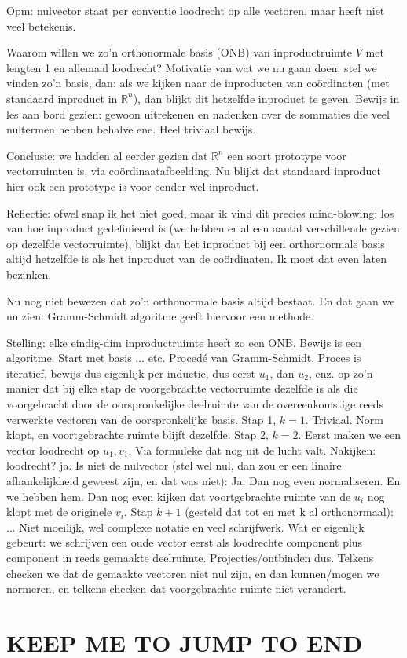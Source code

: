 \documentclass{article}
\begin{document}
Opm: nulvector staat per conventie loodrecht op alle vectoren, maar heeft niet veel betekenis. 

Waarom willen we zo'n orthonormale basis (ONB) van inproductruimte $V$ met lengten 1 en allemaal loodrecht? Motivatie van wat we nu gaan doen: stel we vinden zo'n basis, dan: als we kijken naar de inproducten van co\"ordinaten (met standaard inproduct in $\mathbb{R}^n$), dan blijkt dit hetzelfde inproduct te geven. Bewijs in les aan bord gezien: gewoon uitrekenen en nadenken over de sommaties die veel nultermen hebben behalve ene. Heel triviaal bewijs. 

Conclusie: we hadden al eerder gezien dat $\mathbb{R}^n$ een soort prototype voor vectorruimten is, via co\"ordinaatafbeelding. Nu blijkt dat standaard inproduct hier ook een prototype is voor eender wel inproduct. 

Reflectie: ofwel snap ik het niet goed, maar ik vind dit precies mind-blowing: los van hoe inproduct gedefinieerd is (we hebben er al een aantal verschillende gezien op dezelfde vectorruimte), blijkt dat het inproduct bij een orthornormale basis altijd hetzelfde is als het inproduct van de co\"ordinaten. Ik moet dat even laten bezinken. 

Nu nog niet bewezen dat zo'n orthonormale basis altijd bestaat. En dat gaan we nu zien: Gramm-Schmidt algoritme geeft hiervoor een methode. 

Stelling: elke eindig-dim inproductruimte heeft zo een ONB. 
Bewijs is een algoritme. Start met basis ... etc. Proced\'e van Gramm-Schmidt. Proces is iteratief, bewijs dus eigenlijk per inductie, dus eerst $u_1$, dan $u_2$, enz. op zo'n manier dat bij elke stap de voorgebrachte vectorruimte dezelfde is als die voorgebracht door de oorspronkelijke deelruimte van de overeenkomstige reeds verwerkte vectoren van de oorspronkelijke basis. 
Stap 1, $k=1$. Triviaal. Norm klopt, en voortgebrachte ruimte blijft dezelfde. 
Stap 2, $k=2$. Eerst maken we een vector loodrecht op $u_1,v_1$. Via formuleke dat nog uit de lucht valt. Nakijken: loodrecht? ja. Is niet de nulvector (stel wel nul, dan zou er een linaire afhankelijkheid geweest zijn, en dat was niet): Ja. Dan nog even normaliseren. En we hebben hem. Dan nog even kijken dat voortgebrachte ruimte van de $u_i$ nog klopt met de originele $v_i$. 
Stap $k+1$ (gesteld dat tot en met k al orthonormaal): ... 
Niet moeilijk, wel complexe notatie en veel schrijfwerk. Wat er eigenlijk gebeurt: we schrijven een oude vector eerst als loodrechte component plus component in reeds gemaakte deelruimte. Projecties/ontbinden dus. Telkens checken we dat de gemaakte vectoren niet nul zijn, en dan kunnen/mogen we normeren, en telkens checken dat voorgebrachte ruimte niet verandert.  




\section*{KEEP ME TO JUMP TO END}
\end{document}
